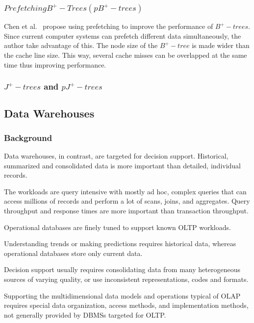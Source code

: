 \documentclass[12pt,a4paper]{article}
\begin{document}
\subsubsection*{$Prefetching B^{+}-Trees (pB^{+}-trees)$}

Chen et al.~\cite{chen2001improving} propose using prefetching to improve the performance of $B^{+}-trees$. Since current computer systems can prefetch different data simultaneously, the author take advantage of this. The node size of the $B^{+}-tree$ is made wider than the cache line size. This way, several cache misses can be overlapped at the same time thus improving performance.

\subsubsection*{$J^{+}-trees$ and $pJ^{+}-trees$}





\subsection{Data Warehouses}
\label{SEC-WAREHOUSES}
\subsubsection*{Background}
Data warehouses, in contrast, are targeted for decision support. Historical, summarized and consolidated data is more important than detailed, individual records.

The workloads are query intensive with mostly ad hoc, complex queries that can access millions of records and perform a lot of scans, joins, and aggregates. Query throughput and response times are more important than transaction throughput.

Operational databases are finely tuned to support known OLTP workloads.

Understanding trends or making predictions requires historical data, whereas operational databases store only current data.

Decision support usually requires consolidating data from many heterogeneous sources of varying quality, or use inconsistent representations, codes and formats.

Supporting the multidimensional data models and operations typical of OLAP requires special data organization, access methods, and implementation methods, not generally provided by DBMSs targeted for OLTP.
\end{document}
